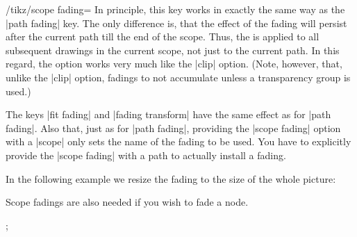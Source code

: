\begin{key}{/tikz/scope fading=}
    In principle, this key works in exactly the same way as the |path fading|
    key. The only difference is, that the effect of the fading will persist
    after the current path till the end of the scope. Thus, the 
    is applied to all subsequent drawings in the current scope, not just to the
    current path. In this regard, the option works very much like the |clip|
    option. (Note, however, that, unlike the |clip| option, fadings to not
    accumulate unless a transparency group is used.)

    The keys |fit fading| and |fading transform| have the same effect as for
    |path fading|. Also that, just as for |path fading|, providing the
    |scope fading| option with a |{scope}| only sets the name of the fading to
    be used. You have to explicitly provide the |scope fading| with a path to
    actually install a fading.
\begin{codeexample}[preamble={\usetikzlibrary{fadings,patterns}},svg]
\end{codeexample}

    In the following example we resize the fading to the size of the whole
    picture:
\begin{codeexample}[preamble={\usetikzlibrary{fadings,patterns}},svg]
\end{codeexample}

    Scope fadings are also needed if you wish to fade a node.
\begin{codeexample}[preamble={\usetikzlibrary{fadings}}]
\tikz {};
\end{codeexample}
\end{key}


